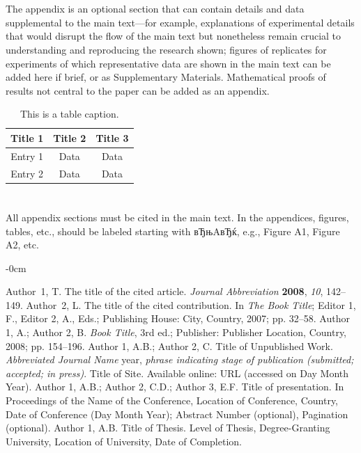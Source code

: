 ﻿\documentclass[journal,article,submit,moreauthors]{Definitions/mdpi}
\begin{document}
\section[\appendixname~\thesection]{}
\subsection[\appendixname~\thesubsection]{}
The appendix is an optional section that can contain details and data supplemental to the main text---for example, explanations of experimental details that would disrupt the flow of the main text but nonetheless remain crucial to understanding and reproducing the research shown; figures of replicates for experiments of which representative data are shown in the main text can be added here if brief, or as Supplementary Materials. Mathematical proofs of results not central to the paper can be added as an appendix.
\begin{table}[H] 
\caption{This is a table caption.\label{tab5}}
\begin{tabularx}{\textwidth}{CCC}
\toprule
\textbf{Title 1}	& \textbf{Title 2}	& \textbf{Title 3}\\
\midrule
Entry 1		& Data			& Data\\
Entry 2		& Data			& Data\\
\bottomrule
\end{tabularx}
\end{table}
\section[\appendixname~\thesection]{}
All appendix sections must be cited in the main text. In the appendices, figures, tables, etc., should be labeled starting with вЂњAвЂќ, e.g., Figure A1, Figure A2, etc.
\begin{adjustwidth}{-\extralength}{0cm}
\begin{thebibliography}{999}
Author~1, T. The title of the cited article. {\em Journal Abbreviation} {\bf 2008}, {\em 10}, 142--149.
Author~2, L. The title of the cited contribution. In {\em The Book Title}; Editor 1, F., Editor 2, A., Eds.; Publishing House: City, Country, 2007; pp. 32--58.
Author 1, A.; Author 2, B. \textit{Book Title}, 3rd ed.; Publisher: Publisher Location, Country, 2008; pp. 154--196.
Author 1, A.B.; Author 2, C. Title of Unpublished Work. \textit{Abbreviated Journal Name} year, \textit{phrase indicating stage of publication (submitted; accepted; in press)}.
Title of Site. Available online: URL (accessed on Day Month Year).
Author 1, A.B.; Author 2, C.D.; Author 3, E.F. Title of presentation. In Proceedings of the Name of the Conference, Location of Conference, Country, Date of Conference (Day Month Year); Abstract Number (optional), Pagination (optional).
Author 1, A.B. Title of Thesis. Level of Thesis, Degree-Granting University, Location of University, Date of Completion.
\end{thebibliography}
\PublishersNote{}
\end{adjustwidth}
\end{document}
